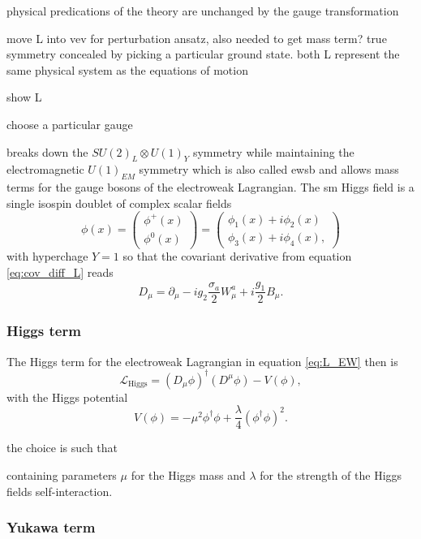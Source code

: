 physical predications of the theory are unchanged by
the gauge transformation


move L into vev for perturbation ansatz, also needed to get mass term? true symmetry concealed by picking a particular ground state. both L represent the same physical system as the equations of motion



show L

choose a particular gauge
























breaks down the $SU(2)_L \otimes U(1)_Y$ symmetry while maintaining the electromagnetic $U(1)_{EM}$ symmetry which is also called \ac{ewsb} and allows mass terms for the gauge bosons of the electroweak Lagrangian. The \ac{sm} Higgs field is a single isospin doublet of complex scalar fields
\begin{equation}
    \phi(x)=
    \begin{pmatrix}
        \phi^+(x) \\
        \phi^0(x)
    \end{pmatrix}
    =
    \begin{pmatrix}
        \phi_1 (x)+i \phi_2 (x) \\
        \phi_3 (x)+i \phi_4 (x),
    \end{pmatrix}
\end{equation}
with hyperchage $Y=1$ so that the covariant derivative from equation \ref{eq:cov_diff_L} reads
\begin{equation}
    D_\mu=\partial_\mu- i g_2\frac{{\sigma}_a}{2}W_\mu^a+ i\frac{g_1}{2}B_\mu.
\end{equation}
\subsubsection*{Higgs term}
The Higgs term for the electroweak Lagrangian in equation \ref{eq:L_EW} then is
\begin{equation}
    \mathcal{L}_\text{Higgs}= \left(D_\mu\phi\right)^\dagger (D^\mu\phi)-V(\phi),
    \label{eq:L_higgs}
\end{equation}
with the Higgs potential
\begin{equation}
    V(\phi) = -\mu^2\phi^\dagger\phi+\frac{\lambda}{4}\left(\phi^\dagger\phi\right)^2.
    \label{eq:Higgs_V}
\end{equation}

the choice is such that


containing parameters $\mu$ for the Higgs mass and $\lambda$ for the strength of the Higgs fields self-interaction.



\subsubsection*{Yukawa term}

